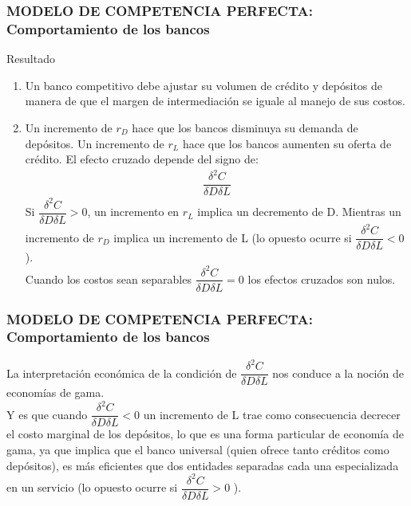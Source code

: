 \documentclass[10pt, xcolor=table, x11names]{beamer}
\begin{document}
\begin{frame}
    \frametitle{{\normalsize MODELO DE COMPETENCIA PERFECTA: Comportamiento de los bancos} {}}
    \begin{block} {Resultado}
        \begin{enumerate}
            \item Un banco competitivo debe ajustar su volumen de crédito y depósitos de manera de que el margen de intermediación se iguale al manejo de sus costos.
            \item Un incremento de $r_{D}$ hace que los bancos disminuya su demanda de depósitos. Un incremento de $r_{L}$ hace que los bancos aumenten su oferta de crédito. El efecto cruzado depende del signo de:
          \begin{align}
          \dfrac{\delta^{2}C}{\delta D \delta L} \nonumber
          \end{align} 
          Si $\dfrac{\delta^{2}C}{\delta D \delta L}>0 $, un incremento en $r_{L}$ implica un decremento de D. Mientras un incremento de  $r_{D}$ implica un incremento de L (lo opuesto ocurre si $\dfrac{\delta^{2}C}{\delta D \delta L}<0 $ ).\\
           Cuando los costos sean separables $\dfrac{\delta^{2}C}{\delta D \delta L}=0 $ los efectos cruzados son nulos.   
        \end{enumerate}     
        
    \end{block}	 


\end{frame}



\begin{frame}
    \frametitle{{\normalsize MODELO DE COMPETENCIA PERFECTA: Comportamiento de los bancos} {}}
    La interpretación económica de la condición de $\dfrac{\delta^{2}C}{\delta D \delta L}$ nos conduce a la noción de economías de gama. \\
    Y es que cuando $\dfrac{\delta^{2}C}{\delta D \delta L}<0$ un incremento de L trae como consecuencia decrecer el costo marginal de los depósitos, lo que es una forma particular de economía de gama, ya que implica que el banco universal (quien ofrece tanto créditos como depósitos), es más eficientes que dos entidades separadas cada una especializada en un servicio (lo opuesto ocurre si $\dfrac{\delta^{2}C}{\delta D \delta L}>0 $ ).
\end{frame}
\end{document}

